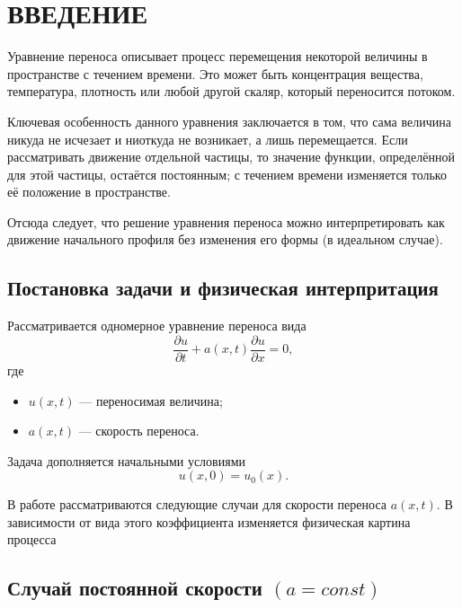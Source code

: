 \documentclass[a4paper,14pt]{extreport}
\begin{document}
\clearpage
\setcounter{page}{2}

\tableofcontents
\thispagestyle{plain}
\newpage


\chapter*{ВВЕДЕНИЕ}
Уравнение переноса описывает процесс перемещения некоторой величины
в пространстве с течением времени. Это может быть концентрация вещества,
температура, плотность или любой другой скаляр, который переносится
потоком.

Ключевая особенность данного уравнения заключается в том, что сама
величина никуда не исчезает и ниоткуда не возникает, а лишь перемещается.
Если рассматривать движение отдельной частицы, то значение функции,
определённой для этой частицы, остаётся постоянным; с течением времени
изменяется только её положение в пространстве.

Отсюда следует, что решение уравнения переноса можно интерпретировать
как движение начального профиля без изменения его формы (в идеальном
случае).

\section*{{Постановка задачи и физическая интерпритация}}
Рассматривается одномерное уравнение переноса вида
\begin{equation}
\frac{\partial u}{\partial t}
+ a(x,t)\frac{\partial u}{\partial x} = 0,
\label{eq:transport}
\end{equation}
где
\begin{itemize}
\item $u(x,t)$ — переносимая величина;
\item $a(x,t)$ — скорость переноса.
\end{itemize}
Задача дополняется начальными условиями
\begin{equation}
u(x,0) = u_0(x).
\label{eq:start}
\end{equation}

В работе рассматриваются следующие случаи для скорости переноса $a(x,t)$. В зависимости от вида этого коэффициента изменяется физическая картина процесса


\section*{Случай постоянной скорости $(a = const)$}
\end{document}
